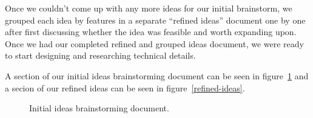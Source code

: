 \documentclass{article}
\begin{document}
Once we couldn't come up with any more ideas for our initial brainstorm, we grouped each idea by features in a separate ``refined ideas'' document one by one after first discussing whether the idea was feasible and worth expanding upon. Once we had our completed refined and grouped ideas document, we were ready to start designing and researching technical details.

A section of our initial ideas brainstorming document can be seen in figure~\ref{initial-ideas} and a secion of our refined ideas can be seen in figure~\ref{refined-ideas}.

\begin{figure}[H]
  \centering
  \caption{Initial ideas brainstorming document.}\label{initial-ideas}
\end{figure}
\end{document}
